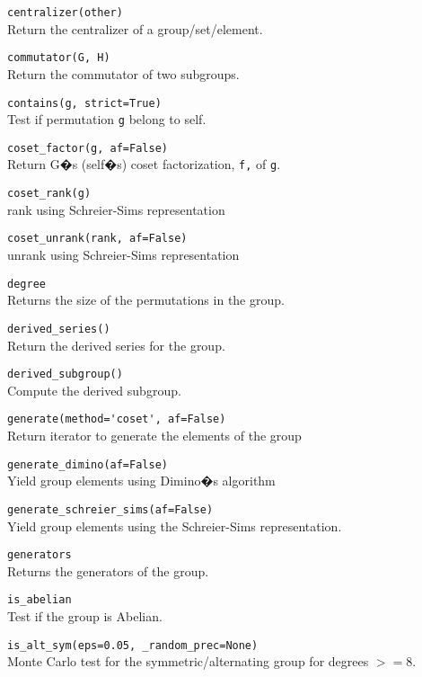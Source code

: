 \documentclass[10pt,landscape]{article}
\begin{document}
\begin{multicols}{3}
\verb!centralizer(other)!\\
Return the centralizer of a group/set/element.



\verb!commutator(G, H)!\\
Return the commutator of two subgroups.


\verb!contains(g, strict=True)!\\
Test if permutation \verb!g! belong to self.



\verb!coset_factor(g, af=False)!\\
Return G�s (self�s) coset factorization, \verb!f,! of \verb!g!.




\verb!coset_rank(g)!\\
rank using Schreier-Sims representation



\verb!coset_unrank(rank, af=False)!\\
unrank using Schreier-Sims representation



\verb!degree!\\
Returns the size of the permutations in the group.



\verb!derived_series()!\\
Return the derived series for the group.


\verb!derived_subgroup()!\\
Compute the derived subgroup.


\verb!generate(method='coset', af=False)!\\
Return iterator to generate the elements of the group


\verb!generate_dimino(af=False)!\\
Yield group elements using Dimino�s algorithm


\verb!generate_schreier_sims(af=False)!\\
Yield group elements using the Schreier-Sims representation.



\verb!generators!\\
Returns the generators of the group.




\verb!is_abelian!\\
Test if the group is Abelian.


\verb!is_alt_sym(eps=0.05, _random_prec=None)!\\
Monte Carlo test for the symmetric/alternating group for degrees $>= 8$.




\end{multicols}
\end{document}
